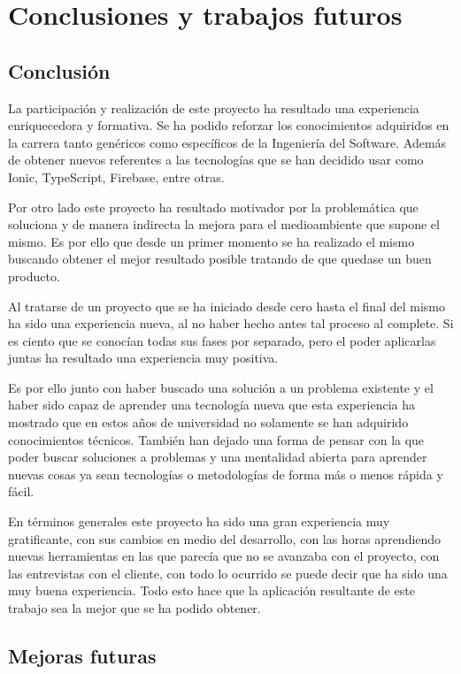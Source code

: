 \section{Conclusiones y trabajos futuros}
\subsection{Conclusión}
La participación y realización de este proyecto ha resultado una
experiencia enriquecedora y formativa. Se ha podido reforzar los
conocimientos adquiridos en la carrera tanto genéricos como específicos
de la Ingeniería del Software. Además de obtener nuevos referentes a
las tecnologías que se han decidido usar como Ionic, TypeScript, Firebase,
entre otras.

\medskip
Por otro lado este proyecto ha resultado motivador por la problemática
que soluciona y de manera indirecta la mejora para el medioambiente
que supone el mismo. Es por ello que desde un primer momento se ha
realizado el mismo buscando obtener el mejor resultado posible tratando
de que quedase un buen producto.

\medskip
Al tratarse de un proyecto que se ha iniciado desde cero hasta el final
del mismo ha sido una experiencia nueva, al no haber hecho antes
tal proceso al complete. Si es ciento que se conocían todas sus
fases por separado, pero el poder aplicarlas juntas ha resultado
una experiencia muy positiva.

\medskip
Es por ello junto con haber buscado una solución a un problema
existente y el haber sido capaz de aprender una tecnología nueva
que esta experiencia ha mostrado que en estos años de universidad
no solamente se han adquirido conocimientos técnicos. También han
dejado una forma de pensar con la que poder buscar soluciones a
problemas y una mentalidad abierta para aprender nuevas cosas
ya sean tecnologías o metodologías de forma más o menos rápida y
fácil.

\medskip
En términos generales este proyecto ha sido una gran experiencia
muy gratificante, con sus cambios en medio del desarrollo, con
las horas aprendiendo nuevas herramientas en las que parecía que
no se avanzaba con el proyecto, con las entrevistas
con el cliente, con todo lo ocurrido se puede decir que ha sido
una muy buena experiencia. Todo esto hace que la aplicación
resultante de este trabajo sea la mejor que se ha podido obtener.

\subsection{Mejoras futuras}